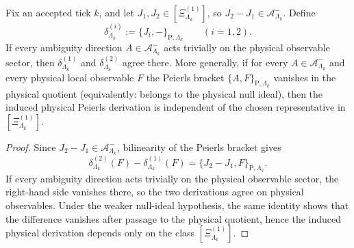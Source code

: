 \begin{proposition}
\label{prop:Main-physical-invariance-ambiguity}
Fix an accepted tick \(k\), and let \(J_1,J_2\in[\Xi^{(1)}_{\Lambda_k}]\), so
\(J_2-J_1\in\mathcal A^-_{\Lambda_k}\). Define
\[
\delta^{(i)}_{\Lambda_k}:=\{J_i,-\}_{\mathrm P,\Lambda_k}
\qquad (i=1,2).
\]
If every ambiguity direction \(A\in\mathcal A^-_{\Lambda_k}\) acts trivially on the
physical observable sector, then \(\delta^{(1)}_{\Lambda_k}\) and
\(\delta^{(2)}_{\Lambda_k}\) agree there. More generally, if for every
\(A\in\mathcal A^-_{\Lambda_k}\) and every physical local observable \(F\) the
Peierls bracket \(\{A,F\}_{\mathrm P,\Lambda_k}\) vanishes in the physical quotient
\textnormal{(equivalently: belongs to the physical null ideal)}, then the induced
physical Peierls derivation is independent of the chosen representative in
\([\Xi^{(1)}_{\Lambda_k}]\).
\end{proposition}

\begin{proof}
Since \(J_2-J_1\in\mathcal A^-_{\Lambda_k}\), bilinearity of the Peierls bracket gives
\[
\delta^{(2)}_{\Lambda_k}(F)-\delta^{(1)}_{\Lambda_k}(F)
=\{J_2-J_1,F\}_{\mathrm P,\Lambda_k}.
\]
If every ambiguity direction acts trivially on the physical observable sector, the
right-hand side vanishes there, so the two derivations agree on physical observables.
Under the weaker null-ideal hypothesis, the same identity shows that the difference
vanishes after passage to the physical quotient, hence the induced physical derivation
depends only on the class \([\Xi^{(1)}_{\Lambda_k}]\).
\end{proof}
